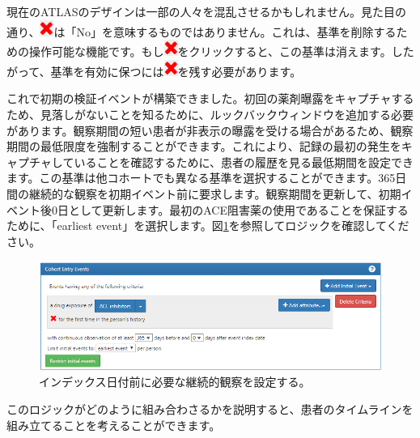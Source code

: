 \documentclass[
  11pt]{book}
\makeatletter
\newenvironment{kframe}{%
\medskip{}
\setlength{\fboxsep}{.8em}
 \def\at@end@of@kframe{}%
 \ifinner\ifhmode%
  \def\at@end@of@kframe{\end{minipage}}%
  \begin{minipage}{\columnwidth}%
 \fi\fi%
 \def\FrameCommand##1{\hskip\@totalleftmargin \hskip-\fboxsep
 \colorbox{myShadeColor}{##1}\hskip-\fboxsep
     \hskip-\linewidth \hskip-\@totalleftmargin \hskip\columnwidth}%
 \MakeFramed {\advance\hsize-\width
   \@totalleftmargin\z@ \linewidth\hsize
   \@setminipage}}%
 {\par\unskip\endMakeFramed%
 \at@end@of@kframe}
\newenvironment{rmdblock}[1]
  {
  \begin{itemize}
  \renewcommand{\labelitemi}{
    \raisebox{-.7\height}[0pt][0pt]{
      {\setkeys{Gin}{width=3em,keepaspectratio}\texttt{[image: images/\#1]}}
    }
  }
  \setlength{\fboxsep}{1em}
  \begin{kframe}
  \item
  }
  {
  \end{kframe}
  \end{itemize}
  }
\newenvironment{rmdimportant}
  {\begin{rmdblock}{important}}
  {\end{rmdblock}}
\theoremstyle{definition}
\theoremstyle{definition}
\theoremstyle{definition}
\theoremstyle{definition}
\theoremstyle{remark}
\makeatother
\begin{document}
\begin{rmdimportant}
現在のATLASのデザインは一部の人々を混乱させるかもしれません。見た目の通り、\includegraphics{images/Cohorts/redX.png}は「No」を意味するものではありません。これは、基準を削除するための操作可能な機能です。もし\includegraphics{images/Cohorts/redX.png}をクリックすると、この基準は消えます。したがって、基準を有効に保つには\includegraphics{images/Cohorts/redX.png}を残す必要があります。
\end{rmdimportant}

これで初期の検証イベントが構築できました。初回の薬剤曝露をキャプチャするため、見落しがないことを知るために、ルックバックウィンドウを追加する必要があります。観察期間の短い患者が非表示の曝露を受ける場合があるため、観察期間の最低限度を強制することができます。これにより、記録の最初の発生をキャプチャしていることを確認するために、患者の履歴を見る最低期間を設定できます。この基準は他コホートでも異なる基準を選択することができます。365日間の継続的な観察を初期イベント前に要求します。観察期間を更新して、初期イベント後0日として更新します。最初のACE阻害薬の使用であることを保証するために、「earliest event」を選択します。図\ref{fig:initialEventAce}を参照してロジックを確認してください。

\begin{figure}

{\centering \includegraphics[width=1\linewidth]{images/Cohorts/initialEventAce} 

}

\caption{インデックス日付前に必要な継続的観察を設定する。}\label{fig:initialEventAce}
\end{figure}

このロジックがどのように組み合わさるかを説明すると、患者のタイムラインを組み立てることを考えることができます。
\end{document}
